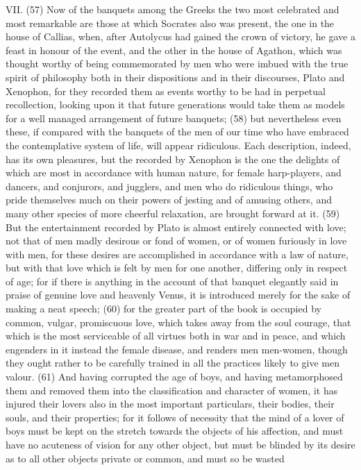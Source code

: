 VII. (57) Now of the banquets among the Greeks the two most celebrated and most remarkable
are those at which Socrates also was present, the one in the house of Callias, when, after
Autolycus had gained the crown of victory, he gave a feast in honour of the event, and the other in
the house of Agathon, which was thought worthy of being commemorated by men who were imbued
with the true spirit of philosophy both in their dispositions and in their discourses, Plato and
Xenophon, for they recorded them as events worthy to be had in perpetual recollection, looking
upon it that future generations would take them as models for a well managed arrangement of
future banquets; (58) but nevertheless even these, if compared with the banquets of the men of
our time who have embraced the contemplative system of life, will appear ridiculous. Each
description, indeed, has its own pleasures, but the recorded by Xenophon is the one the delights of
which are most in accordance with human nature, for female harp-players, and dancers, and
conjurors, and jugglers, and men who do ridiculous things, who pride themselves much on their
powers of jesting and of amusing others, and many other species of more cheerful relaxation, are
brought forward at it. (59) But the entertainment recorded by Plato is almost entirely connected with
love; not that of men madly desirous or fond of women, or of women furiously in love with men, for
these desires are accomplished in accordance with a law of nature, but with that love which is felt
by men for one another, differing only in respect of age; for if there is anything in the account of
that banquet elegantly said in praise of genuine love and heavenly Venus, it is introduced merely
for the sake of making a neat speech; (60) for the greater part of the book is occupied by
common, vulgar, promiscuous love, which takes away from the soul courage, that which is the most
serviceable of all virtues both in war and in peace, and which engenders in it instead the female
disease, and renders men men-women, though they ought rather to be carefully trained in all the
practices likely to give men valour. (61) And having corrupted the age of boys, and having
metamorphosed them and removed them into the classification and character of women, it has
injured their lovers also in the most important particulars, their bodies, their souls, and their
properties; for it follows of necessity that the mind of a lover of boys must be kept on the stretch
towards the objects of his affection, and must have no acuteness of vision for any other object, but
must be blinded by its desire as to all other objects private or common, and must so be wasted
